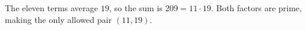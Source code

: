 The eleven terms average $19$, so the sum is $209=11\cdot19$. Both factors are prime, making the only allowed pair $\boxed{(11,19)}$.
